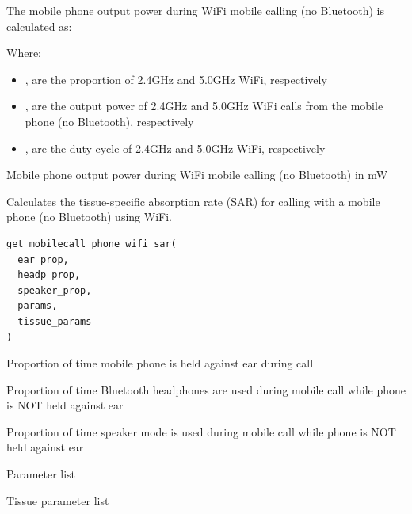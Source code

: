 \documentclass[a4paper]{book}
\begin{document}
\begin{Details}
The mobile phone output power during WiFi mobile calling (no Bluetooth) is calculated as:

Where:
\begin{itemize}

\item{} ,  are the proportion of 2.4GHz and 5.0GHz WiFi, respectively
\item{} ,  are the output power of 2.4GHz and 5.0GHz WiFi calls from the mobile phone (no Bluetooth), respectively
\item{} ,  are the duty cycle of 2.4GHz and 5.0GHz WiFi, respectively

\end{itemize}

\end{Details}
%
\begin{Value}
Mobile phone output power during WiFi mobile calling (no Bluetooth) in mW
\end{Value}
%
\begin{Description}
Calculates the tissue-specific absorption rate (SAR) for calling with a mobile phone (no Bluetooth) using WiFi.
\end{Description}
%
\begin{Usage}
\begin{verbatim}
get_mobilecall_phone_wifi_sar(
  ear_prop,
  headp_prop,
  speaker_prop,
  params,
  tissue_params
)
\end{verbatim}
\end{Usage}
%
\begin{Arguments}
\begin{ldescription}
\item[\code{ear\_prop}] Proportion of time mobile phone is held against ear during call

\item[\code{headp\_prop}] Proportion of time Bluetooth headphones are used during mobile call while phone is NOT held against ear

\item[\code{speaker\_prop}] Proportion of time speaker mode is used during mobile call while phone is NOT held against ear

\item[\code{params}] Parameter list

\item[\code{tissue\_params}] Tissue parameter list
\end{ldescription}
\end{Arguments}
\end{document}
